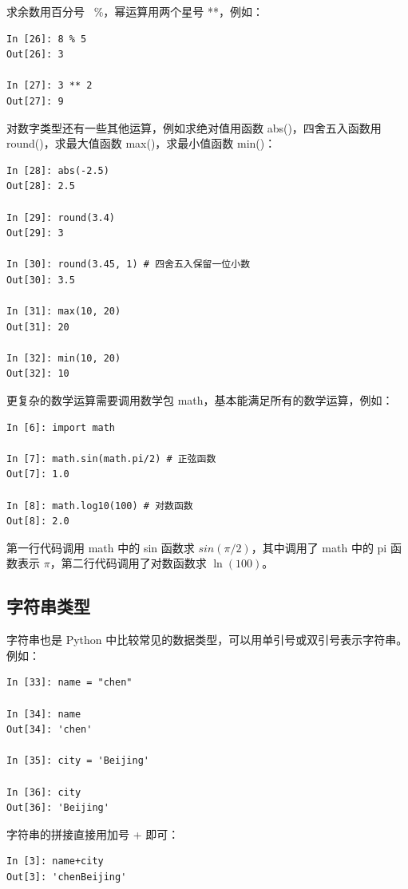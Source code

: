 求余数用百分号~ \%，幂运算用两个星号 **，例如：

\begin{lstlisting}[Language=Python]
In [26]: 8 % 5
Out[26]: 3

In [27]: 3 ** 2
Out[27]: 9
\end{lstlisting}

对数字类型还有一些其他运算，例如求绝对值用函数 abs()，四舍五入函数用 round()，求最大值函数 max()，求最小值函数 min()：

\begin{lstlisting}[Language=Python]
In [28]: abs(-2.5)
Out[28]: 2.5

In [29]: round(3.4)
Out[29]: 3

In [30]: round(3.45, 1) # 四舍五入保留一位小数
Out[30]: 3.5

In [31]: max(10, 20)
Out[31]: 20

In [32]: min(10, 20)
Out[32]: 10
\end{lstlisting}

更复杂的数学运算需要调用数学包 math，基本能满足所有的数学运算，例如：

\begin{lstlisting}[Language=Python]
In [6]: import math

In [7]: math.sin(math.pi/2) # 正弦函数
Out[7]: 1.0

In [8]: math.log10(100) # 对数函数
Out[8]: 2.0
\end{lstlisting}

第一行代码调用 math 中的 sin 函数求 $sin(\pi/2)$，其中调用了 math 中的 pi 函数表示 $\pi$，第二行代码调用了对数函数求 $\ln(100)$。

\subsection{字符串类型}

字符串也是 Python 中比较常见的数据类型，可以用单引号或双引号表示字符串。例如：

\begin{lstlisting}[Language=Python]
In [33]: name = "chen"

In [34]: name
Out[34]: 'chen'

In [35]: city = 'Beijing'

In [36]: city
Out[36]: 'Beijing'
\end{lstlisting}

字符串的拼接直接用加号 + 即可：

\begin{lstlisting}[Language=Python]
In [3]: name+city
Out[3]: 'chenBeijing'
\end{lstlisting}

